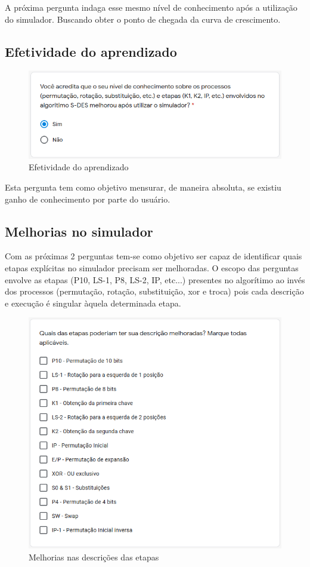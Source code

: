 A próxima pergunta indaga esse mesmo nível de conhecimento após a utilização do simulador. Buscando obter o ponto de chegada da curva de crescimento.

\subsection{Efetividade do aprendizado}

\begin{figure}[H]
    \centering
    \caption{Efetividade do aprendizado}
    \includegraphics[width=0.75\linewidth]{Questionario/Q4.png}
\end{figure}

Esta pergunta tem como objetivo mensurar, de maneira absoluta, se existiu ganho de conhecimento por parte do usuário.

\subsection{Melhorias no simulador}

Com as próximas 2 perguntas tem-se como objetivo ser capaz de identificar quais etapas explícitas no simulador precisam ser melhoradas. O escopo das perguntas envolve as etapas (P10, LS-1, P8, LS-2, IP, etc...) presentes no algorítimo ao invés dos processos (permutação, rotação, substituição, xor e troca) pois cada descrição e execução é singular àquela determinada etapa.

\begin{figure}[H]
    \centering
    \caption{Melhorias nas descrições das etapas}
    \includegraphics[width=0.7\linewidth]{Questionario/Q5.png}
\end{figure}

